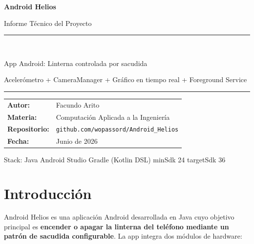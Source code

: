 \documentclass[12pt, a4paper]{article}
\begin{document}

\begin{titlepage}
  \centering
  \vspace*{3cm}
  {\Huge\bfseries Android Helios\par}
  \vspace{0.6cm}
  {\Large Informe T\'ecnico del Proyecto\par}
  \vspace{2.5cm}
  {\color{vscKeyword}\rule{0.55\textwidth}{1.5pt}}\\[0.8em]
  {\large App Android: Linterna controlada por sacudida\par}
  {\small Aceler\'ometro + CameraManager + Gr\'afico en tiempo real + Foreground Service\par}
  {\color{vscKeyword}\rule{0.55\textwidth}{1.5pt}}
  \vspace{2.5cm}

  \begin{tabular}{@{}ll@{}}
    \textbf{Autor:}       & Facundo Arito \\[0.4em]
    \textbf{Materia:}     & Computaci\'on Aplicada a la Ingenier\'ia \\[0.4em]
    \textbf{Repositorio:} & \texttt{github.com/wopassord/Android\_Helios} \\[0.4em]
    \textbf{Fecha:}       & Junio de 2026 \\
  \end{tabular}

  \vfill
  {\small Stack: Java \textbullet{} Android Studio \textbullet{} Gradle (Kotlin DSL)
  \textbullet{} minSdk 24 \textbullet{} targetSdk 36}
\end{titlepage}

\tableofcontents
\clearpage

\section{Introducci\'on}

Android Helios es una aplicaci\'on Android desarrollada en Java cuyo objetivo
principal es \textbf{encender o apagar la linterna del tel\'efono mediante un
patr\'on de sacudida configurable}. La app integra dos m\'odulos de hardware:
\end{document}
